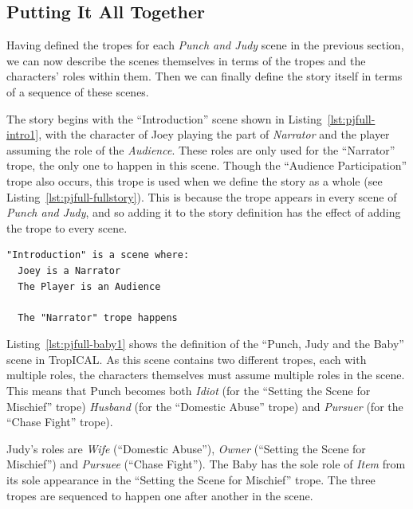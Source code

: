 \documentclass[11pt]{report}
\begin{document}
\subsection{Putting It All Together}
\label{sec:put-together-pj}
Having defined the tropes for each \emph{Punch and Judy} scene in the previous
section, we can now describe the scenes themselves in terms of the tropes and
the characters' roles within them. Then we can finally define the story itself
in terms of a sequence of these scenes.

The story begins with the ``Introduction'' scene shown in Listing~\ref{lst:pjfull-intro1}, with the character of Joey
playing the part of \emph{Narrator} and the player assuming the role of the
\emph{Audience}. These roles are only used for the ``Narrator'' trope, the only
one to happen in this scene. Though the ``Audience Participation'' trope also
occurs, this trope is used when we define the story as a whole (see
Listing~\ref{lst:pjfull-fullstory}). This is because the trope appears in every
scene of \emph{Punch and Judy}, and so adding it to the story definition has the
effect of adding the trope to every scene.

\begin{lstlisting}[showstringspaces=false,
label=lst:pjfull-intro1,caption={The ``Introduction'' scene in TropICAL}]
"Introduction" is a scene where:
  Joey is a Narrator
  The Player is an Audience

  The "Narrator" trope happens
\end{lstlisting}

Listing~\ref{lst:pjfull-baby1} shows the definition of the ``Punch, Judy and the
Baby'' scene in TropICAL. As this scene contains two different tropes, each with
multiple roles, the characters themselves must assume multiple roles in the
scene. This means that Punch becomes both \emph{Idiot} (for the ``Setting the
Scene for Mischief'' trope) \emph{Husband} (for the ``Domestic Abuse'' trope) and \emph{Pursuer} (for the ``Chase Fight'' trope).

Judy's roles are \emph{Wife} (``Domestic Abuse''), \emph{Owner} (``Setting the
Scene for Mischief'') and \emph{Pursuee} (``Chase Fight''). The Baby has the
sole role of \emph{Item} from its sole appearance in the ``Setting the Scene for
Mischief'' trope. The three tropes are sequenced to happen one after another in
the scene.
\end{document}
